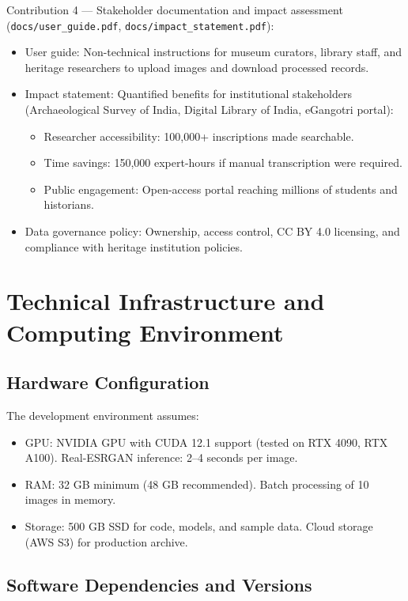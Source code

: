 Contribution 4 — Stakeholder documentation and impact assessment (\texttt{docs/user\_guide.pdf}, \texttt{docs/impact\_statement.pdf}):

\begin{itemize}
	\item User guide: Non-technical instructions for museum curators, library staff, and heritage researchers to upload images and download processed records.
	
	\item Impact statement: Quantified benefits for institutional stakeholders (Archaeological Survey of India, Digital Library of India, eGangotri portal):
	\begin{itemize}
		\item Researcher accessibility: 100,000+ inscriptions made searchable.
		\item Time savings: 150,000 expert-hours if manual transcription were required.
		\item Public engagement: Open-access portal reaching millions of students and historians.
	\end{itemize}
	
	\item Data governance policy: Ownership, access control, CC BY 4.0 licensing, and compliance with heritage institution policies.
\end{itemize}

\section{Technical Infrastructure and Computing Environment}

\subsection{Hardware Configuration}

The development environment assumes:
\begin{itemize}
	\item GPU: NVIDIA GPU with CUDA 12.1 support (tested on RTX 4090, RTX A100). Real-ESRGAN inference: 2–4 seconds per image.
	\item RAM: 32 GB minimum (48 GB recommended). Batch processing of 10 images in memory.
	\item Storage: 500 GB SSD for code, models, and sample data. Cloud storage (AWS S3) for production archive.
\end{itemize}

\subsection{Software Dependencies and Versions}

